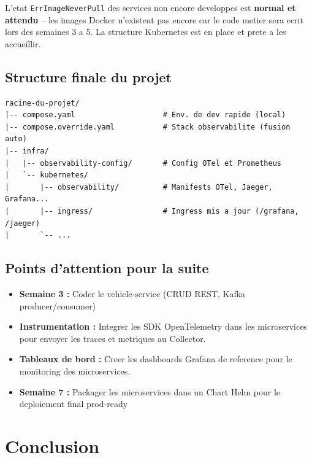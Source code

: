\documentclass[12pt,a4paper]{article}
\begin{document}
\begin{infobox}
L'etat \texttt{ErrImageNeverPull} des services non encore developpes est
\textbf{normal et attendu} -- les images Docker n'existent pas encore car le code
metier sera ecrit lors des semaines 3 a 5. La structure Kubernetes est en place et
prete a les accueillir.
\end{infobox}

\subsection{Structure finale du projet}

\begin{lstlisting}[caption=Arborescence des dossiers d'infrastructure]
racine-du-projet/
|-- compose.yaml                    # Env. de dev rapide (local)
|-- compose.override.yaml           # Stack observabilite (fusion auto)
|-- infra/
|   |-- observability-config/       # Config OTel et Prometheus
|   `-- kubernetes/
|       |-- observability/          # Manifests OTel, Jaeger, Grafana...
|       |-- ingress/                # Ingress mis a jour (/grafana, /jaeger)
|       `-- ...
\end{lstlisting}

\subsection{Points d'attention pour la suite}

\begin{itemize}
  \item \textbf{Semaine 3 :} Coder le vehicle-service (CRUD REST, Kafka producer/consumer)
  \item \textbf{Instrumentation :} Integrer les SDK OpenTelemetry dans les microservices pour envoyer les traces et metriques au Collector.
  \item \textbf{Tableaux de bord :} Creer les dashboards Grafana de reference pour le monitoring des microservices.
  \item \textbf{Semaine 7 :} Packager les microservices dans un Chart Helm pour le deploiement final prod-ready
\end{itemize}

\section{Conclusion}
\end{document}
